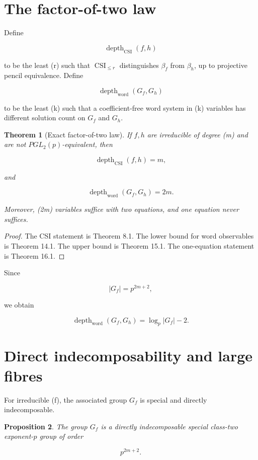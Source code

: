 \documentclass[11pt]{article}
\newtheorem{theorem}{Theorem}[section]
\newtheorem{proposition}[theorem]{Proposition}
\begin{document}
\section{The factor-of-two law}

Define

\[
\operatorname{depth}_{\mathrm{CSI}}(f,h)
\]

to be the least (r) such that $\operatorname{CSI}_{\le r}$ distinguishes $\beta_f$ from $\beta_h$, up to projective pencil equivalence. Define

\[
\operatorname{depth}_{\mathrm{word}}(G_f,G_h)
\]

to be the least (k) such that a coefficient-free word system in (k) variables has different solution count on $G_f$ and $G_h$.

\begin{theorem}[Exact factor-of-two law]
If $f,h$ are irreducible of degree (m) and are not $PGL_2(p)$-equivalent, then

\[
\boxed{
\operatorname{depth}_{\mathrm{CSI}}(f,h)=m,
}
\]

and

\[
\boxed{
\operatorname{depth}_{\mathrm{word}}(G_f,G_h)=2m.
}
\]

Moreover, (2m) variables suffice with two equations, and one equation never suffices.

\end{theorem}

\begin{proof}
The CSI statement is Theorem 8.1. The lower bound for word observables is Theorem 14.1. The upper bound is Theorem 15.1. The one-equation statement is Theorem 16.1.

\end{proof}

Since

\[
|G_f|=p^{2m+2},
\]

we obtain

\[
\boxed{
\operatorname{depth}_{\mathrm{word}}(G_f,G_h)
=\log_p|G_f|-2.
}
\tag{17.1}
\]

\section{Direct indecomposability and large fibres}

For irreducible (f), the associated group $G_f$ is special and directly indecomposable.

\begin{proposition}
The group $G_f$ is a directly indecomposable special class-two exponent-$p$ group of order

\[
p^{2m+2}.
\]

\end{proposition}
\end{document}
